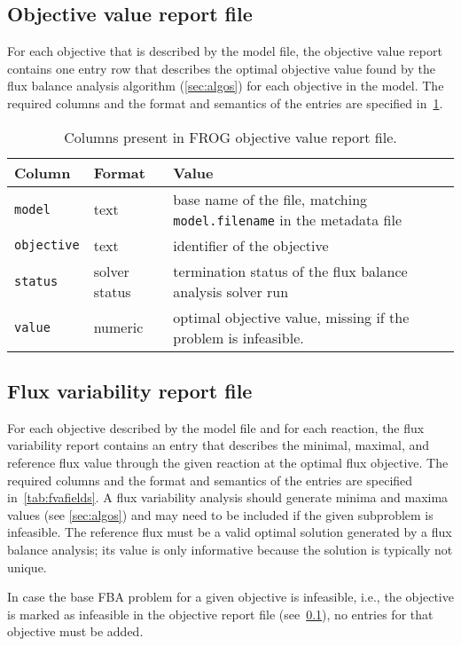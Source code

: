\subsection{Objective value report file}
\label{sec:obj}

For each objective that is described by the model file, the objective value report contains one entry row that describes the optimal objective value found by the flux balance analysis algorithm (\cref{sec:algos}) for each objective in the model. The required columns and the format and semantics of the entries are specified in~\cref{tab:objfields}.

\begin{table}\tablefont
\begin{tabular}{llp{30em}}
\toprule
Column & Format & Value \\
\midrule
\verb|model|
 & text
 & base name of the file, matching \verb|model.filename| in the metadata file
 \\
\verb|objective|
 & text
 & identifier of the objective
 \\
\verb|status|
 & solver status
 & termination status of the flux balance analysis solver run
 \\
\verb|value|
 & numeric
 & optimal objective value, missing if the problem is infeasible.
 \\
\bottomrule
\end{tabular}
\caption{Columns present in FROG objective value report file.}
\label{tab:objfields}
\end{table}

\subsection{Flux variability report file}
\label{sec:fva}
For each objective described by the model file and for each reaction, the flux variability report contains an entry that describes the minimal, maximal, and reference flux value through the given reaction at the optimal flux objective. The required columns and the format and semantics of the entries are specified in~\cref{tab:fvafields}.
A flux variability analysis should generate minima and maxima values (see \cref{sec:algos}) and may need to be included if the given subproblem is infeasible. The reference flux must be a valid optimal solution generated by a flux balance analysis; its value is only informative because the solution is typically not unique.

In case the base FBA problem for a given objective is infeasible, i.e., the objective is marked as infeasible in the objective report file (see~\cref{sec:obj}), no entries for that objective must be added.

